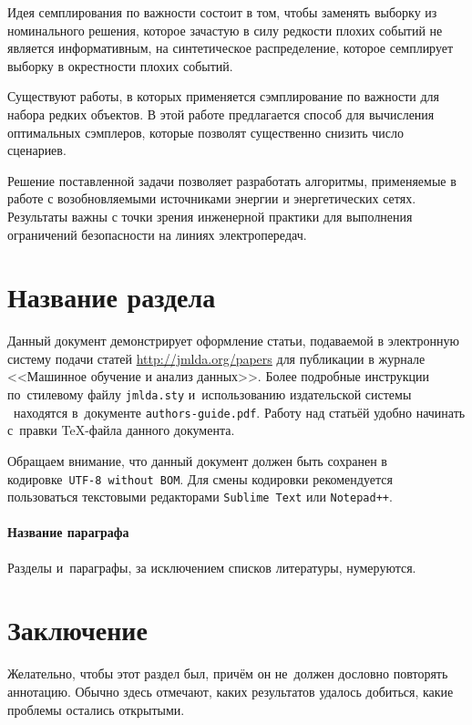 \documentclass[12pt, twoside]{article}
\begin{document}
Идея семплирования по важности состоит в том, чтобы заменять выборку из номинального решения, которое зачастую в силу редкости плохих событий не является информативным, на синтетическое распределение, которое семплирует выборку в окрестности плохих событий. 

Существуют работы, в которых применяется сэмплирование по важности для набора редких объектов. В этой работе предлагается способ для вычисления оптимальных сэмплеров, которые позволят существенно снизить число сценариев.

Решение поставленной задачи позволяет разработать алгоритмы, применяемые в работе с возобновляемыми источниками энергии и энергетических сетях. Результаты важны с точки зрения инженерной практики для выполнения ограничений безопасности на линиях электропередач.

\section{Название раздела}
Данный документ демонстрирует оформление статьи,
подаваемой в электронную систему подачи статей \url{http://jmlda.org/papers} для публикации в журнале <<Машинное обучение и анализ данных>>.
Более подробные инструкции по~стилевому файлу \texttt{jmlda.sty} и~использованию издательской системы \LaTeXe\
находятся в~документе \texttt{authors-guide.pdf}.
Работу над статьёй удобно начинать с~правки \TeX-файла данного документа.

Обращаем внимание, что данный документ должен быть сохранен в кодировке~\verb'UTF-8 without BOM'.
Для смены кодировки рекомендуется пользоваться текстовыми редакторами \verb'Sublime Text' или \verb'Notepad++'.

\paragraph{Название параграфа}
Разделы и~параграфы, за исключением списков литературы, нумеруются.

\section{Заключение}
Желательно, чтобы этот раздел был, причём он не~должен дословно повторять аннотацию.
Обычно здесь отмечают, каких результатов удалось добиться, какие проблемы остались открытыми.

\end{document}
